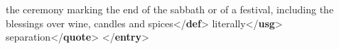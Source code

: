 \begin{shaded}
\hspace*{1em}the ceremony marking the end of the sabbath or of a festival,\mbox{}\newline 
\hspace*{1em}\hspace*{1em}\hspace*{1em}\hspace*{1em} including the blessings over wine, candles and spices{</\textbf{def}>}\mbox{}\newline 
{}\mbox{}\newline 
{}\mbox{}\newline 
\hspace*{1em}literally{</\textbf{usg}>}\mbox{}\newline 
\hspace*{1em}separation{</\textbf{quote}>}\mbox{}\newline 
{}\mbox{}\newline 
{</\textbf{entry}>}\end{shaded}\egroup\par 
